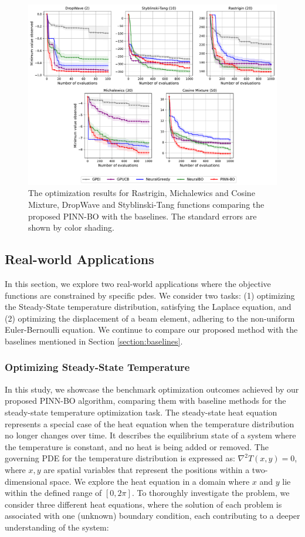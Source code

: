 \begin{figure}[H] %
  \centering
  \includegraphics[width=\textwidth]{Figures/PINN-BO/pinn-bo_all_synthetic.pdf} 
  \caption{The optimization results for Rastrigin, Michalewics and Cosine Mixture, DropWave and Styblinski-Tang functions comparing the proposed PINN-BO with the baselines. The standard errors are shown by color shading.}
  \label{fig:pinn-bo_synthetic}
\end{figure}


\subsection{Real-world Applications}
In this section, we explore two real-world applications where the objective functions are constrained by specific \acp{pde}. We consider two tasks: (1) optimizing the Steady-State temperature distribution, satisfying the  Laplace equation, and (2) optimizing the displacement of a beam element, adhering to the non-uniform Euler-Bernoulli equation. We continue to compare our proposed method with the baselines mentioned in Section \ref{section:baselines}. 

\subsubsection{Optimizing Steady-State Temperature}
\label{section:pinn-bo_experiments_2d_laplace}
In this study, we showcase the benchmark optimization outcomes achieved by our proposed PINN-BO algorithm, comparing them with baseline methods for the steady-state temperature optimization task. The steady-state heat equation represents a special case of the heat equation when the temperature distribution no longer changes over time. It describes the equilibrium state of a system where the temperature is constant, and no heat is being added or removed.  The governing PDE for the temperature distribution is expressed as: $\nabla^2 T(x, y) = 0$, where $x, y$ are spatial variables that represent the positions within a two-dimensional space. We explore the heat equation in a domain where $x$ and $y$ lie within the defined range of $[0,2\pi]$. To thoroughly investigate the problem, we consider three different heat equations, where the solution of each problem is associated with one (unknown) boundary condition, each contributing to a deeper understanding of the system: 

